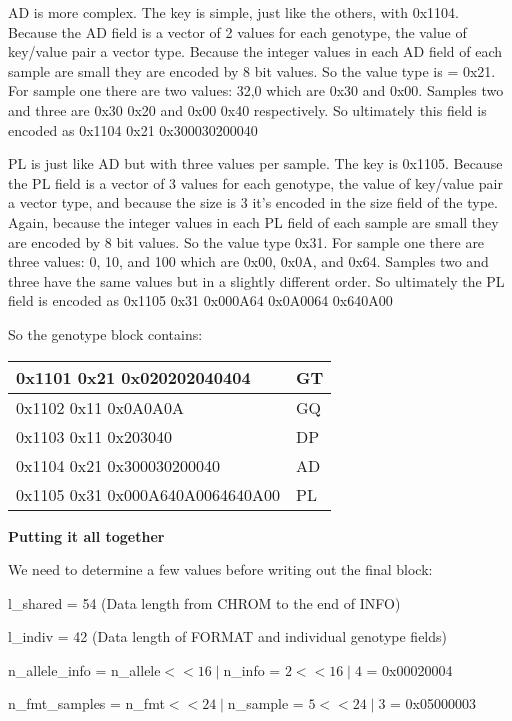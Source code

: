 \documentclass[8pt]{article}
\begin{document}
AD is more complex.  The key is simple, just like the others, with 0x1104.  Because the AD field is a vector of 2 values for each genotype, the value of key/value pair a vector type.  Because the integer values in each AD field of each sample are small they are encoded by 8 bit values.  So the value type is = 0x21.  For sample one there are two values: 32,0 which are 0x30 and 0x00.  Samples two and three are 0x30 0x20 and 0x00 0x40 respectively.  So ultimately this field is encoded as 0x1104 0x21 0x300030200040

PL is just like AD but with three values per sample.  The key is 0x1105.  Because the PL field is a vector of 3 values for each genotype, the value of key/value pair a vector type, and because the size is 3 it's encoded in the size field of the type.  Again, because the integer values in each PL field of each sample are small they are encoded by 8 bit values.  So the value type 0x31.  For sample one there are three values: 0, 10, and 100 which are 0x00, 0x0A, and 0x64.  Samples two and three have the same values but in a slightly different order.  So ultimately the PL field is encoded as 0x1105 0x31 0x000A64 0x0A0064 0x640A00

So the genotype block contains:

\vspace{0.3cm}
\begin{tabular}{|l| l|} \hline
0x1101 0x21 0x020202040404 & GT \\ \hline
0x1102 0x11 0x0A0A0A & GQ \\ \hline
0x1103 0x11 0x203040 & DP \\ \hline
0x1104 0x21 0x300030200040 & AD \\ \hline
0x1105 0x31 0x000A640A0064640A00 & PL \\ \hline
\end{tabular}
\vspace{0.3cm}

\textbf{Putting it all together}

We need to determine a few values before writing out the final block:

l\_shared = 54 (Data length from CHROM to the end of INFO)

l\_indiv = 42 (Data length of FORMAT and individual genotype fields)

n\_allele\_info = n\_allele$<<16\mid$n\_info = $2 << 16 \mid 4$ = 0x00020004

n\_fmt\_samples = n\_fmt$<<24\mid$n\_sample = $5 << 24 \mid 3$ = 0x05000003
\end{document}
